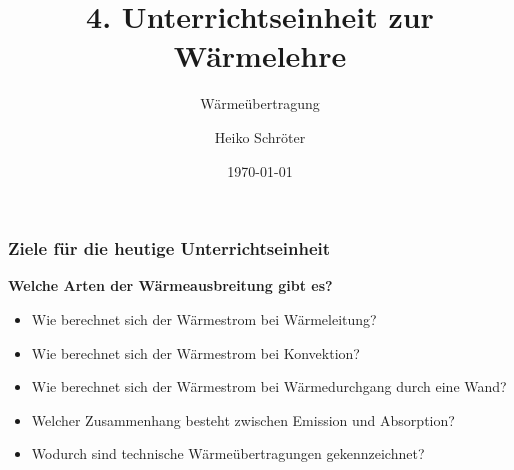 \documentclass{beamer}
\title{4. Unterrichtseinheit zur Wärmelehre}
\subtitle{Wärmeübertragung}
\author{Heiko Schröter}
\date{\today}
\begin{document}
\frame{\titlepage}

\frame
{
  \frametitle{Ziele für die heutige Unterrichtseinheit}
  \textbf{Welche Arten der Wärmeausbreitung gibt es?}
  \begin{itemize}
	\item Wie berechnet sich der Wärmestrom bei Wärmeleitung?
	\item Wie berechnet sich der Wärmestrom bei Konvektion?
	\item Wie berechnet sich der Wärmestrom bei Wärmedurchgang durch eine Wand?
	\item Welcher Zusammenhang besteht zwischen Emission und Absorption?
	\item Wodurch sind technische Wärmeübertragungen gekennzeichnet?
  \end{itemize}
}

\frame[allowframebreaks]
\end{document}
